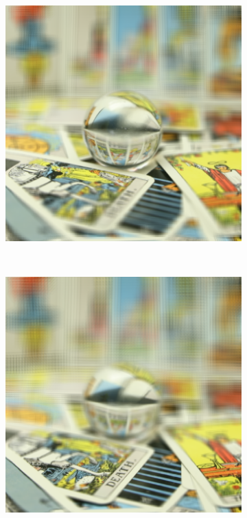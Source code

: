 \documentclass[11pt,a4paper,titlepage]{article}
\begin{document}
\begin{figure}
\begin{subfigure}[t]{0.19\textwidth}
	\end{subfigure}%
	~
	\begin{subfigure}[t]{0.19\textwidth}
		\includegraphics[width=\textwidth]{results/tarot_back_projection/sensorPlaneZ=-0.5/Back_Projection_layer_4.png} 
	\end{subfigure}%
	~
	\begin{subfigure}[t]{0.19\textwidth}
		\includegraphics[width=\textwidth]{results/tarot_back_projection/sensorPlaneZ=-0.5/Back_Projection_layer_5.png} 

\end{subfigure}
\end{figure}
\end{document}
